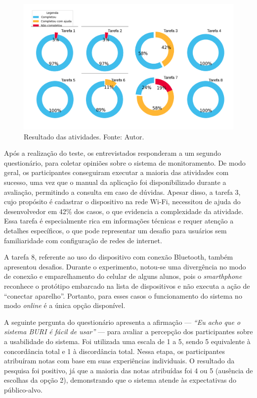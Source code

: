 \begin{figure}[ht]
    \centering
    \includegraphics[width=.94\textwidth]{img/questionario/1/graf-atividades-resultado.png}
    \caption{Resultado das atividades. Fonte: Autor.}\label{grafAtvResultado}
\end{figure}

Após a realização do teste, os entrevistados responderam a um segundo questionário, para coletar opiniões sobre o 
sistema de monitoramento. De modo geral, os participantes conseguiram executar a maioria das atividades com sucesso, uma vez que o manual 
da aplicação foi disponibilizado durante a avaliação, permitindo a consulta em caso de dúvidas. Apesar disso, a tarefa 3, cujo propósito é cadastrar o dispositivo na 
rede Wi-Fi, necessitou de ajuda do desenvolvedor em 42\% dos casos, o que evidencia a complexidade da atividade. Essa tarefa é especialmente rica em 
informações técnicas e requer atenção a detalhes específicos, o que pode representar um desafio para usuários sem familiaridade com configuração de redes de internet.

A tarefa 8, referente ao uso do dispositivo com conexão Bluetooth, também apresentou desafios. Durante o experimento, notou-se uma divergência 
no modo de conexão e emparelhamento do celular de alguns alunos, pois o \textit{smarthphone} reconhece o protótipo embarcado na lista de dispositivos e não executa a ação de ``conectar aparelho''. Portanto, para 
esses casos o funcionamento do sistema no modo \textit{online} é a única opção disponível. 

A seguinte pergunta do questionário apresenta a afirmação — \textit{``Eu acho que o sistema BURI é fácil de usar''} — para avaliar a percepção dos participantes sobre a usabilidade 
do sistema. Foi utilizada uma escala de 1 a 5, sendo 5 equivalente à concordância total e 1 à discordância total. Nessa etapa, os participantes atribuíram notas com base em suas experiências 
individuais. O resultado da pesquisa foi positivo, já que a maioria das notas atribuídas foi 4 ou 5 (ausência de escolhas da opção 2), demonstrando que o sistema atende às expectativas do público-alvo.

